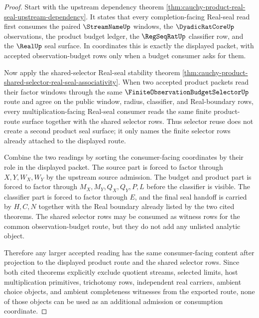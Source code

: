 \begin{proof}
Start with the upstream dependency theorem \autoref{thm:cauchy-product-real-seal-upstream-dependency}. It states that every completion-facing Real-seal read first consumes the paired $\StreamNameUp$ windows, the $\DyadicRatCoreUp$ observations, the product budget ledger, the $\RegSeqRatUp$ classifier row, and the $\RealUp$ seal surface. In coordinates this is exactly the displayed packet, with accepted observation-budget rows only when a budget consumer asks for them.

Now apply the shared-selector Real-seal stability theorem \autoref{thm:cauchy-product-shared-selector-real-seal-associativity}. When two accepted product packets read their factor windows through the same $\FiniteObservationBudgetSelectorUp$ route and agree on the public window, radius, classifier, and Real-boundary rows, every multiplication-facing Real-seal consumer reads the same finite product-route surface together with the shared selector rows. Thus selector reuse does not create a second product seal surface; it only names the finite selector rows already attached to the displayed route.

Combine the two readings by sorting the consumer-facing coordinates by their role in the displayed packet. The source part is forced to factor through $X,Y,W_X,W_Y$ by the upstream source admission. The budget and product part is forced to factor through $M_X,M_Y,Q_X,Q_Y,P,L$ before the classifier is visible. The classifier part is forced to factor through $E$, and the final seal handoff is carried by $H,C,N$ together with the Real boundary already listed by the two cited theorems. The shared selector rows may be consumed as witness rows for the common observation-budget route, but they do not add any unlisted analytic object.

Therefore any larger accepted reading has the same consumer-facing content after projection to the displayed product route and the shared selector rows. Since both cited theorems explicitly exclude quotient streams, selected limits, host multiplication primitives, trichotomy rows, independent real carriers, ambient choice objects, and ambient completeness witnesses from the exported route, none of those objects can be used as an additional admission or consumption coordinate.
\end{proof}

